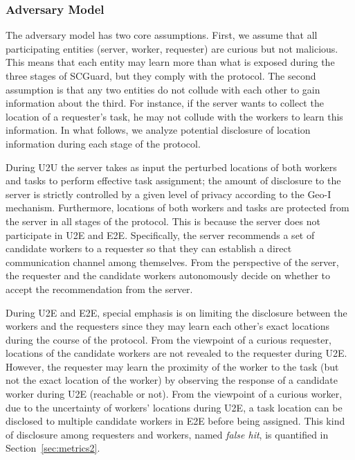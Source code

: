 \documentclass{USC-Thesis}
\newcommand{\SCG}{{SCGuard}}
\numberwithin{equation}{chapter}
\begin{document}
\subsubsection{Adversary Model}

The adversary model has two core assumptions. First, we assume that all participating entities (server, worker, requester) are curious but not malicious. This means that each entity may learn more than what is exposed during the three stages of \SCG, but they comply with the protocol. The second assumption is that any two entities do not collude with each other to gain information about the third. For instance, if the server wants to collect the location of a requester's task, he may not collude with the workers to learn this information. In what follows, we analyze potential disclosure of location information during each stage of the protocol.

During U2U the server takes as input the perturbed locations of both workers and tasks to perform effective task assignment; 
the amount of disclosure to the server is strictly controlled by a given level of privacy according to the Geo-I mechanism. Furthermore, locations of both workers and tasks are protected from the server in all stages of the protocol. This is because the server does not participate in U2E and E2E. Specifically, the server recommends a set of candidate workers to a requester so that they can establish a direct communication channel among themselves. From the perspective of the server, the requester and the candidate workers autonomously decide on whether to accept the recommendation from the server.

During U2E and E2E, special emphasis is on limiting the disclosure between the workers and the requesters since they may learn each other's exact locations during the course of the protocol. From the viewpoint of a curious requester, locations of the candidate workers are not revealed to the requester during U2E. However, the requester may learn the proximity of the worker to the task (but not the exact location of the worker) by observing the response of a candidate worker during U2E (reachable or not). From the viewpoint of a curious worker, due to the uncertainty of workers' locations during U2E, a task location can be disclosed to multiple candidate workers in E2E before being assigned. This kind of disclosure among requesters and workers, named \emph{false hit}, is quantified in Section~\ref{sec:metrics2}.
\end{document}
